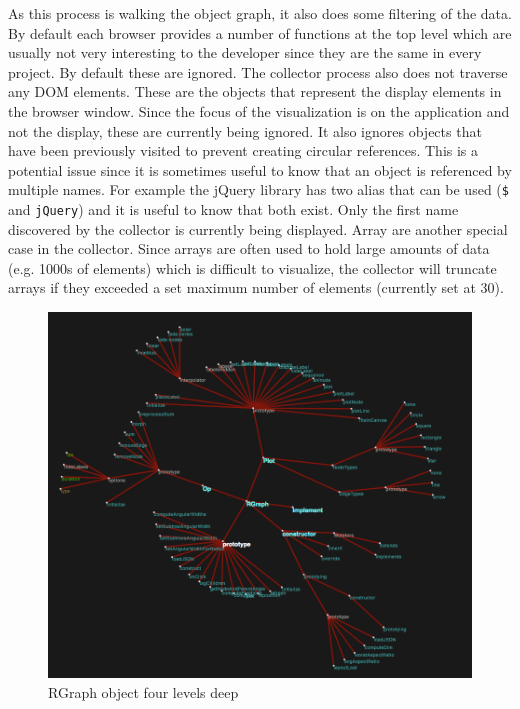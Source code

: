 \documentclass[]{article}
\begin{document}
As this process is walking the object graph, it also does some filtering of the data. By default each browser provides a number of functions at the top level which are usually not very interesting to the developer since they are the same in every project. By default these are ignored. The collector process also does not traverse any DOM elements. These are the objects that represent the display elements in the browser window. Since the focus of the visualization is on the application and not the display, these are currently being ignored. It also ignores objects that have been previously visited to prevent creating circular references. This is a potential issue since it is sometimes useful to know that an object is referenced by multiple names. For example the jQuery library \cite{jquery} has two alias that can be used ({\tt \$} and {\tt jQuery}) and it is useful to know that both exist. Only the first name discovered by the collector is currently being displayed. Array are another special case in the collector. Since arrays are often used to hold large amounts of data (e.g. 1000s of elements) which is difficult to visualize, the collector will truncate arrays if they exceeded a set maximum number of elements (currently set at 30).



\begin{figure}[h]
  \begin{center}
    \includegraphics[scale=.35]{rgraph.png}
  \end{center}
  \caption{RGraph object four levels deep}
  \label{fig:rgraph}
\end{figure}
\end{document}
